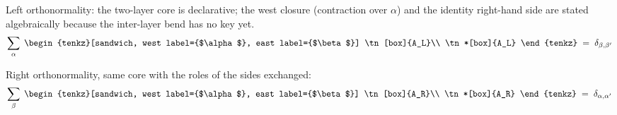 \documentclass[varwidth=19cm, border=6pt]{standalone}
\begin{document}
Left orthonormality: the two-layer core is declarative; the west closure
(contraction over $\alpha$) and the identity right-hand side are stated
algebraically because the inter-layer bend has no key yet.
\[
  \sum_{\alpha}\;
  \begin{tenkz}[sandwich,
                west label={$\alpha$}, east label={$\beta$}]
    \tn[box]{A_L}\\
    \tn*[box]{A_L}
  \end{tenkz}
  \;=\; \delta_{\beta,\beta'}
\]

Right orthonormality, same core with the roles of the sides exchanged:
\[
  \sum_{\beta}\;
  \begin{tenkz}[sandwich,
                west label={$\alpha$}, east label={$\beta$}]
    \tn[box]{A_R}\\
    \tn*[box]{A_R}
  \end{tenkz}
  \;=\; \delta_{\alpha,\alpha'}
\]
\end{document}
